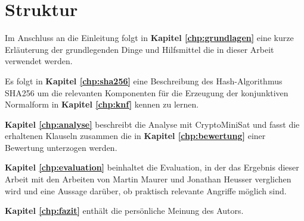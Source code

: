 \section{Struktur}

Im Anschluss an die Einleitung folgt in \textbf{Kapitel \ref{chp:grundlagen}} eine kurze Erläuterung der
grundlegenden Dinge und Hilfsmittel die in dieser Arbeit verwendet werden. 

Es folgt in \textbf{Kapitel \ref{chp:sha256}} eine Beschreibung des Hash-Algorithmus SHA256 um die relevanten
Komponenten für die Erzeugung der konjunktiven Normalform in \textbf{Kapitel \ref{chp:knf}} kennen zu lernen.

\textbf{Kapitel \ref{chp:analyse}} beschreibt die Analyse mit CryptoMiniSat und fasst die erhaltenen Klauseln
zusammen die in \textbf{Kapitel \ref{chp:bewertung}} einer Bewertung unterzogen werden.

\textbf{Kapitel \ref{chp:evaluation}} beinhaltet die Evaluation, in der das Ergebnis dieser Arbeit mit den
Arbeiten von Martin Maurer und Jonathan Heusser verglichen wird und eine Aussage darüber, ob praktisch
relevante Angriffe möglich sind.

\textbf{Kapitel \ref{chp:fazit}} enthält die persönliche Meinung des Autors.